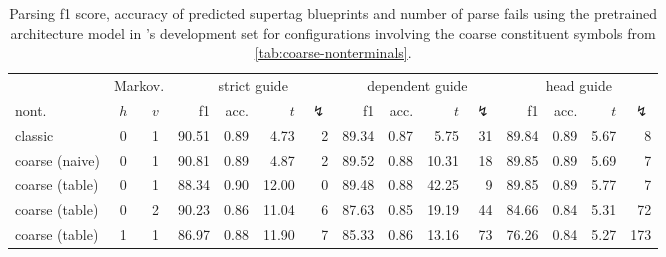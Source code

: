 \documentclass[../../document.tex]{subfiles}
\begin{document}
    \begin{table}
        \caption{\label{tbl:gridsearch:coarse:3}
        Parsing f1 score, accuracy of predicted supertag blueprints and number of parse fails using the pretrained architecture model in \negra{}'s development set for configurations involving the coarse constituent symbols from \cref{tab:coarse-nonterminals}.
        }
        \centering
        \vspace{.2cm}
        \setlength{\tabcolsep}{3.5pt}
        \begin{tabular}{lcc|rrrr|rrrr|rrrr}
            \toprule
    & \multicolumn{2}{c|}{Markov.}         & \multicolumn{4}{c|}{strict guide} &  \multicolumn{4}{c|}{dependent guide} &  \multicolumn{4}{c}{head guide} \\
    nont.           & \(h\) & \(v\) & f1 & acc. & $t$ & $\lightning$ & f1 & acc. & $t$ & $\lightning$  & f1 & acc. & $t$ & $\lightning$  \\ \hline\rowcolor{black!10}
classic        & 0 & 1 & 90.51 & 0.89 &  4.73 & 2 & 89.34 & 0.87 &  5.75 & 31 & 89.84 & 0.89 & 5.67 & 8 \\\rowcolor{black!10}
coarse (naive) & 0 & 1 & 90.81 & 0.89 &  4.87 & 2 & 89.52 & 0.88 & 10.31 & 18 & 89.85 & 0.89 & 5.69 & 7 \\\hline
coarse (table) & 0 & 1 & 88.34 & 0.90 & 12.00 & 0 & 89.48 & 0.88 & 42.25 &  9 & 89.85 & 0.89 & 5.77 & 7 \\
coarse (table) & 0 & 2 & 90.23 & 0.86 & 11.04 & 6 & 87.63 & 0.85 & 19.19 & 44 & 84.66 & 0.84 & 5.31 & 72 \\
coarse (table) & 1 & 1 & 86.97 & 0.88 & 11.90 & 7 & 85.33 & 0.86 & 13.16 & 73 & 76.26 & 0.84 & 5.27 & 173 \\
\bottomrule
        \end{tabular}
    \end{table}
    
\end{document}

